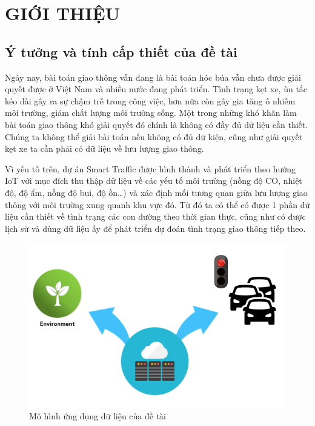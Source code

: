 
\chapter{GIỚI THIỆU}  %

\ifpdf
    \graphicspath{{Chapter1/Figs/Raster/}{Chapter1/Figs/PDF/}{Chapter1/Figs/}}
\else
    \graphicspath{{Chapter1/Figs/Vector/}{Chapter1/Figs/}}
\fi


\section{Ý tưởng và tính cấp thiết của đề tài}\label{section1.1}

Ngày nay, bài toán giao thông vẫn đang là bài toán hóc búa vẫn chưa được giải quyết được ở Việt Nam và nhiều nước đang phát triển. Tình trạng kẹt xe, ùn tắc kéo dài gây ra sự chậm trễ trong công việc, hơn nữa còn  gây gia tăng ô nhiễm môi trường, giảm chất lượng môi trường sống. Một trong những khó khăn làm bài toán giao thông khó giải quyết đó chính là không có đầy đủ dữ liệu cần thiết. Chúng ta không thể giải bài toán nếu không có đủ dữ kiện, cũng như giải quyết kẹt xe ta cần phải có dữ liệu về lưu lượng giao thông.

Vì yếu tố trên, dự án Smart Traffic được hình thành và phát triển theo hướng IoT với mục đích thu thập dữ liệu về các yếu tố môi trường (nồng độ CO, nhiệt độ, độ ẩm, nồng độ bụi, độ ồn…) và xác định mối tương quan giữa lưu lượng giao thông với môi trường xung quanh khu vực đó. Từ đó ta có thể có được 1 phần dữ liệu cần thiết về tình trạng các con đường theo thời gian thực, cũng như có được lịch sử và dùng dữ liệu ấy để phát triển dự đoán tình trạng giao thông tiếp theo.

\begin{figure}[H] 
\centering    
\includegraphics[width=1.0\textwidth]{pic1}
\caption[Mô hình ứng dụng dữ liệu của đề tài]{Mô hình ứng dụng dữ liệu của đề tài}
\label{fig:pic1}
\end{figure}

